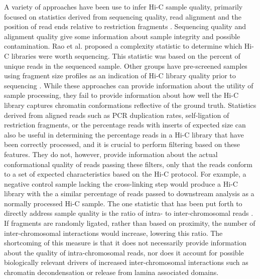 A variety of approaches have been use to infer Hi-C sample quality, primarily focused on statistics derived from sequencing quality, read alignment and the position of read ends relative to restriction fragments \cite{sexton_three-dimensional_2012,dixon_topological_2012,le_dily_distinct_2014,rao_3d_2014,stevens_3d_2017,phanstiel_static_2017,nora_targeted_2017}. Sequencing quality and alignment quality give some information about sample integrity and possible contamination. Rao et al. \cite{rao_3d_2014} proposed a complexity statistic to determine which Hi-C libraries were worth sequencing. This statistic was based on the percent of unique reads in the sequenced sample. Other groups have pre-screened samples using fragment size profiles as an indication of Hi-C library quality prior to sequencing \cite{stevens_3d_2017,phanstiel_static_2017}. While these approaches can provide information about the utility of sample processing, they fail to provide information about how well the Hi-C library captures chromatin conformations reflective of the ground truth. Statistics derived from aligned reads such as PCR duplication rates, self-ligation of restriction fragments, or the percentage reads with inserts of expected size can also be useful in determining the percentage reads in a Hi-C library that have been correctly processed, and it is crucial to perform filtering based on these features. They do not, however, provide information about the actual conformational quality of reads passing these filters, only that the reads conform to a set of expected characteristics based on the Hi-C protocol. For example, a negative control sample lacking the cross-linking step would produce a Hi-C library with the a similar percentage of reads  passed to downstream analysis as a normally processed Hi-C sample. The one statistic that has been put forth to directly address sample quality is the ratio of intra- to inter-chromosomal reads \cite{nagano_comparison_2015}. If fragments are randomly ligated, rather than based on proximity, the number of inter-chromosomal interactions would increase, lowering this ratio. The shortcoming of this measure is that it does not necessarily provide information about the quality of intra-chromosomal reads, nor does it account for possible biologically relevant drivers of increased inter-chromosomal interactions such as chromatin decondensation or release from lamina associated domains.


